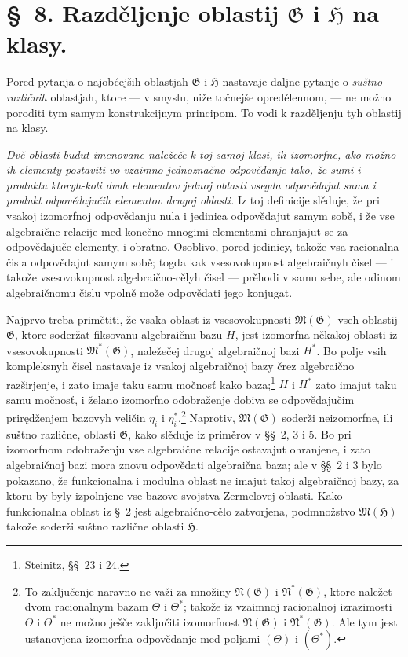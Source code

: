 \documentclass[11pt]{article}
\begin{document}
\section*{\S\ 8. Razděljenje oblastij $\mathfrak G$ i $\mathfrak H$ na klasy.}

Pored pytanja o najobćejših oblastjah $\mathfrak G$ i $\mathfrak H$ nastavaje
daljne pytanje o {\itshape suštno različnih} oblastjah, ktore --- v smyslu,
niže točnejše opredělennom, --- ne možno poroditi tym samym konstrukcijnym
principom. To vodi k razděljenju tyh oblastij na klasy.

{\itshape Dvě oblasti budut imenovane naležeče k toj samoj klasi, ili
izomorfne, ako možno ih elementy postaviti vo vzaimno jednoznačno odpovědanje
tako, že sumi i produktu ktoryh-koli dvuh elementov jednoj oblasti vsegda
odpovědajut suma i produkt odpovědajučih elementov drugoj oblasti.} Iz toj
definicije slěduje, že pri vsakoj izomorfnoj odpovědanju nula i jedinica
odpovědajut samym sobě, i že vse algebraične relacije med konečno mnogimi
elementami ohranjajut se za odpovědajuče elementy, i obratno. Osoblivo, pored
jedinicy, takože vsa racionalna čisla odpovědajut samym sobě; togda kak
vsesovokupnost algebraičnyh čisel --- i takože vsesovokupnost algebraično-cělyh
čisel --- prěhodi v samu sebe, ale odinom algebraičnomu čislu vpolně može
odpovědati jego konjugat.

Najprvo treba primětiti, že vsaka oblast iz vsesovokupnosti
$\mathfrak M(\mathfrak G)$ vseh oblastij $\mathfrak G$, ktore soderžat
fiksovanu algebraičnu bazu $H$, jest izomorfna někakoj oblasti iz
vsesovokupnosti $\mathfrak M^*(\mathfrak G)$, naležečej drugoj algebraičnoj
bazi $H^*$. Bo polje vsih kompleksnyh čisel nastavaje iz vsakoj algebraičnoj
bazy črez algebraično razširjenje, i zato imaje taku samu močnosť kako baza;\footnote{Steinitz,
\S\S\ 23 i 24.} $H$ i $H^*$ zato imajut taku samu močnosť, i želano
izomorfno odobraženje dobiva se odpovědajučim prirędženjem bazovyh veličin
$\eta_i$ i $\eta_i^*$.\footnote{To zaključenje naravno ne važi za množiny
$\mathfrak N(\mathfrak G)$ i $\mathfrak N^*(\mathfrak G)$, ktore naležet dvom
racionalnym bazam $\Theta$ i $\Theta^*$; takože iz vzaimnoj racionalnoj
izrazimosti $\Theta$ i $\Theta^*$ ne možno ješče zaključiti izomorfnost
$\mathfrak N(\mathfrak G)$ i $\mathfrak N^*(\mathfrak G)$. Ale tym jest
ustanovjena izomorfna odpovědanje med poljami $(\Theta)$ i $(\Theta^*)$.}
Naprotiv, $\mathfrak M(\mathfrak G)$ soderži neizomorfne, ili suštno različne,
oblasti $\mathfrak G$, kako slěduje iz priměrov v \S\S\ 2, 3 i 5. Bo pri
izomorfnom odobraženju vse algebraične relacije ostavajut ohranjene, i zato
algebraičnoj bazi mora znovu odpovědati algebraična baza; ale v \S\S\ 2 i 3
bylo pokazano, že funkcionalna i modulna oblast ne imajut takoj algebraičnoj
bazy, za ktoru by byly izpolnjene vse bazove svojstva Zermelovej oblasti. Kako
funkcionalna oblast iz \S\ 2 jest algebraično-cělo zatvorjena, podmnožstvo
$\mathfrak M(\mathfrak H)$ takože soderži suštno različne oblasti
$\mathfrak H$.
\end{document}
